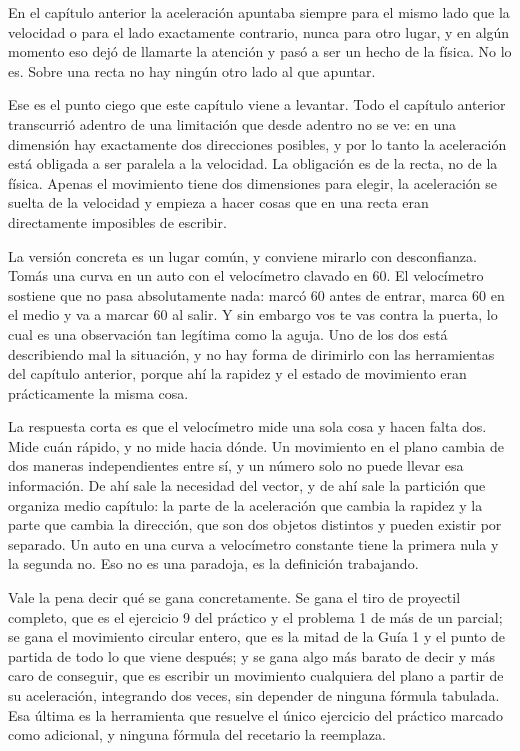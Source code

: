\documentclass[11pt,openany]{book}
\begin{document}
\begin{motivacion}
En el capítulo anterior la aceleración apuntaba siempre para el mismo lado que la velocidad o para el lado exactamente contrario, nunca para otro lugar, y en algún momento eso dejó de llamarte la atención y pasó a ser un hecho de la física. No lo es. Sobre una recta no hay ningún otro lado al que apuntar.
\end{motivacion}

Ese es el punto ciego que este capítulo viene a levantar. Todo el capítulo anterior transcurrió adentro de una limitación que desde adentro no se ve: en una dimensión hay exactamente dos direcciones posibles, y por lo tanto la aceleración está obligada a ser paralela a la velocidad. La obligación es de la recta, no de la física. Apenas el movimiento tiene dos dimensiones para elegir, la aceleración se suelta de la velocidad y empieza a hacer cosas que en una recta eran directamente imposibles de escribir.

La versión concreta es un lugar común, y conviene mirarlo con desconfianza. Tomás una curva en un auto con el velocímetro clavado en 60. El velocímetro sostiene que no pasa absolutamente nada: marcó 60 antes de entrar, marca 60 en el medio y va a marcar 60 al salir. Y sin embargo vos te vas contra la puerta, lo cual es una observación tan legítima como la aguja. Uno de los dos está describiendo mal la situación, y no hay forma de dirimirlo con las herramientas del capítulo anterior, porque ahí la rapidez y el estado de movimiento eran prácticamente la misma cosa.

La respuesta corta es que el velocímetro mide una sola cosa y hacen falta dos. Mide cuán rápido, y no mide hacia dónde. Un movimiento en el plano cambia de dos maneras independientes entre sí, y un número solo no puede llevar esa información. De ahí sale la necesidad del vector, y de ahí sale la partición que organiza medio capítulo: la parte de la aceleración que cambia la rapidez y la parte que cambia la dirección, que son dos objetos distintos y pueden existir por separado. Un auto en una curva a velocímetro constante tiene la primera nula y la segunda no. Eso no es una paradoja, es la definición trabajando.

Vale la pena decir qué se gana concretamente. Se gana el tiro de proyectil completo, que es el ejercicio 9 del práctico y el problema 1 de más de un parcial; se gana el movimiento circular entero, que es la mitad de la Guía 1 y el punto de partida de todo lo que viene después; y se gana algo más barato de decir y más caro de conseguir, que es escribir un movimiento cualquiera del plano a partir de su aceleración, integrando dos veces, sin depender de ninguna fórmula tabulada. Esa última es la herramienta que resuelve el único ejercicio del práctico marcado como adicional, y ninguna fórmula del recetario la reemplaza.
\end{document}
